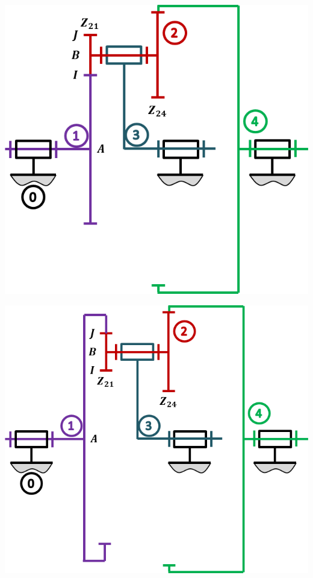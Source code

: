 \documentclass[10pt,fleqn]{article} %
\begin{document}
\begin{multicols}{2}
\begin{center}
\includegraphics[width=\linewidth]{images/train_02}
\end{center}

\vspace{1cm}

\begin{center}
\includegraphics[width=\linewidth]{images/train_03}
\end{center}


\end{multicols}
\end{document}
